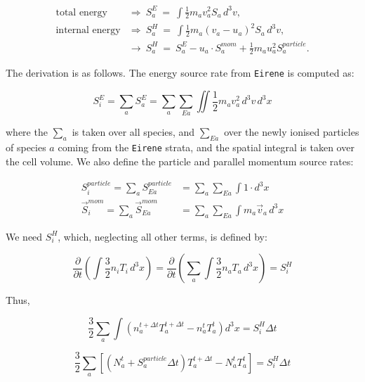 \documentclass[a4paper,10pt]{report}
\begin{document}
\hspace*{2cm}
\begin{minipage}{12cm}
  \begin{align}
    \mbox{total energy} & \Rightarrow\ S_a^E\ =\ \int \frac{1}{2} m_a v_a^2 S_a \, d^3v,\\
    \mbox{internal energy} & \Rightarrow\ S_a^H\ =\ \int \frac{1}{2} m_a \left(
v_a - u_a \right)^2 S_a \, d^3v,\\
    & \rightarrow\ S_a^H \ =\ S_a^E - u_a \cdot S_a^{mom} + \frac{1}{2} m_a u_a^2 S_a^{particle}.
  \end{align}
\end{minipage}

The derivation is as follows. The energy source rate from {\tt Eirene} is computed as:

\begin{equation*}
S_i^E = \sum_a S_a^E = \sum_a \sum_{Ea} \iint \frac{1}{2} m_a v_a^2 \, d^3v \, d^3x
\end{equation*}

where the $\sum_a$ is taken over all species, and $\sum_{Ea}$ over the
newly ionised particles of species $a$ coming from the {\tt Eirene} strata,
and the spatial integral is taken over the cell volume.
We also define the particle and parallel momentum source rates:

\begin{align*}
S_i^{particle} = \sum_a S_{Ea}^{particle} &= \sum_a \sum_{Ea} \int 1 \cdot d^3x \\
\vec{S}_i^{mom} = \sum_a \vec{S}_{Ea}^{mom} &= \sum_a \sum_{Ea} \int m_a \vec{v}_a \, d^3x
\end{align*}

We need $S_i^H$, which, neglecting all other terms, is defined by:

\begin{equation*}
\frac {\partial}{\partial t} \left( \int \frac{3}{2} n_i T_i \, d^3x \right) = \frac {\partial}{\partial t} \left( \sum_a \int \frac{3}{2} n_a T_a \, d^3x \right) = S_i^H
\end{equation*}

Thus,

\begin{equation*}
\frac{3}{2} \sum_a \int \left( n_a^{t+\Delta t} T_a^{t+\Delta t} - n_a^t T_a^t \right) d^3x = S_i^H \Delta t
\end{equation*}

\begin{equation*}
\frac{3}{2} \sum_a \left[ \left( N_a^t + S_a^{particle} \Delta t \right) T_a^{t+\Delta t} - N_a^t T_a^t \right] = S_i^H \Delta t
\end{equation*}
\end{document}
